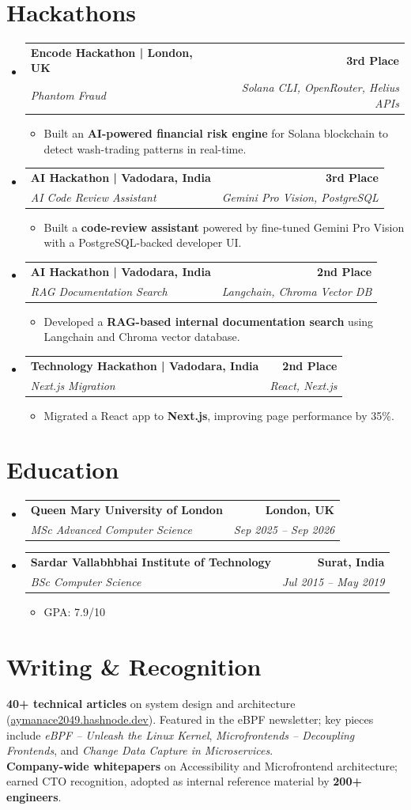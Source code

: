 \documentclass[letterpaper,11pt]{article}
\makeatletter
\newcommand{\resumeItem}[1]{
  \item\small{
    {#1 \vspace{-3pt}}
  }
}
\newcommand{\resumeSubheading}[4]{
  \vspace{-3pt}\item
    \begin{tabular*}{1.0\textwidth}[t]{l@{\extracolsep{\fill}}r}
      \textbf{#1} & \textbf{\small #2} \\
      \textit{\small#3} & \textit{\small #4} \\
    \end{tabular*}\vspace{-7pt}
}
\newcommand{\resumeSubHeadingListStart}{\begin{itemize}[leftmargin=0.0in, label={}]}
\newcommand{\resumeSubHeadingListEnd}{\end{itemize}}
\newcommand{\resumeItemListStart}{\begin{itemize}}
\newcommand{\resumeItemListEnd}{\end{itemize}\vspace{0pt}}
\makeatother
\begin{document}
\section{Hackathons}
\resumeSubHeadingListStart
    \resumeSubheading
      {Encode Hackathon | London, UK}{3rd Place}
      {Phantom Fraud}{Solana CLI, OpenRouter, Helius APIs}
      \resumeItemListStart
        \resumeItem{Built an \textbf{AI-powered financial risk engine} for Solana blockchain to detect wash-trading patterns in real-time.}
      \resumeItemListEnd
    \resumeSubheading
      {AI Hackathon | Vadodara, India}{3rd Place}
      {AI Code Review Assistant}{Gemini Pro Vision, PostgreSQL}
      \resumeItemListStart
        \resumeItem{Built a \textbf{code-review assistant} powered by fine-tuned Gemini Pro Vision with a PostgreSQL-backed developer UI.}
      \resumeItemListEnd
    \resumeSubheading
      {AI Hackathon | Vadodara, India}{2nd Place}
      {RAG Documentation Search}{Langchain, Chroma Vector DB}
      \resumeItemListStart
        \resumeItem{Developed a \textbf{RAG-based internal documentation search} using Langchain and Chroma vector database.}
      \resumeItemListEnd
    \resumeSubheading
      {Technology Hackathon | Vadodara, India}{2nd Place}
      {Next.js Migration}{React, Next.js}
      \resumeItemListStart
        \resumeItem{Migrated a React app to \textbf{Next.js}, improving page performance by 35\%.}
      \resumeItemListEnd
\resumeSubHeadingListEnd

\section{Education}
  \resumeSubHeadingListStart
    \resumeSubheading
      {Queen Mary University of London}{London, UK}
      {MSc Advanced Computer Science}{Sep 2025 -- Sep 2026}
    \resumeSubheading
      {Sardar Vallabhbhai Institute of Technology}{Surat, India}
      {BSc Computer Science}{Jul 2015 -- May 2019}
      \resumeItemListStart
        \resumeItem{GPA: 7.9/10}
      \resumeItemListEnd
  \resumeSubHeadingListEnd

\section{Writing \& Recognition}
\small
\textbf{40+ technical articles} on system design and architecture (\href{https://aymanace2049.hashnode.dev}{aymanace2049.hashnode.dev}). Featured in the eBPF newsletter; key pieces include \textit{eBPF -- Unleash the Linux Kernel}, \textit{Microfrontends -- Decoupling Frontends}, and \textit{Change Data Capture in Microservices}. \\[3pt]
\textbf{Company-wide whitepapers} on Accessibility and Microfrontend architecture; earned CTO recognition, adopted as internal reference material by \textbf{200+ engineers}.
\end{document}
